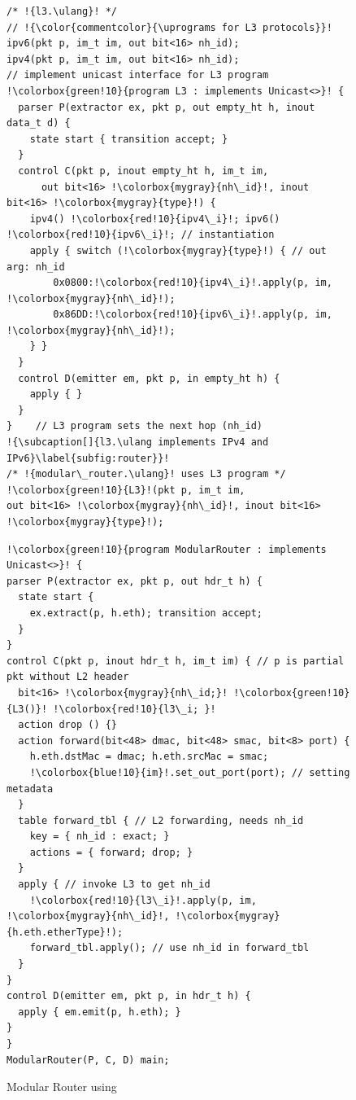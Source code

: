 \documentclass[letterpaper,twocolumn,10pt]{article}
\begin{document}
\begin{figure}[!ht]
\noindent \begin{minipage}[t]{.50\textwidth}
\begin{lstlisting}[frame=none, escapechar=!]
/* !{l3.\ulang}! */
// !{\color{commentcolor}{\uprograms for L3 protocols}}! 
ipv6(pkt p, im_t im, out bit<16> nh_id);
ipv4(pkt p, im_t im, out bit<16> nh_id);
// implement unicast interface for L3 program
!\colorbox{green!10}{program L3 : implements Unicast<>}! {
  parser P(extractor ex, pkt p, out empty_ht h, inout data_t d) {
    state start { transition accept; }
  }
  control C(pkt p, inout empty_ht h, im_t im,
      out bit<16> !\colorbox{mygray}{nh\_id}!, inout bit<16> !\colorbox{mygray}{type}!) {
    ipv4() !\colorbox{red!10}{ipv4\_i}!; ipv6() !\colorbox{red!10}{ipv6\_i}!; // instantiation
    apply { switch (!\colorbox{mygray}{type}!) { // out arg: nh_id
        0x0800:!\colorbox{red!10}{ipv4\_i}!.apply(p, im, !\colorbox{mygray}{nh\_id}!);
        0x86DD:!\colorbox{red!10}{ipv6\_i}!.apply(p, im, !\colorbox{mygray}{nh\_id}!);
    } }
  }
  control D(emitter em, pkt p, in empty_ht h) {
    apply { }
  }
}    // L3 program sets the next hop (nh_id)
!{\subcaption[]{l3.\ulang implements IPv4 and IPv6}\label{subfig:router}}!
/* !{modular\_router.\ulang}! uses L3 program */
!\colorbox{green!10}{L3}!(pkt p, im_t im, 
out bit<16> !\colorbox{mygray}{nh\_id}!, inout bit<16> !\colorbox{mygray}{type}!);
\end{lstlisting}
\end{minipage}\hspace{-4pt}\vline
\hfill\begin{minipage}[t]{.50\textwidth}
\begin{lstlisting}[frame=none, escapechar=!]
!\colorbox{green!10}{program ModularRouter : implements Unicast<>}! {
parser P(extractor ex, pkt p, out hdr_t h) {
  state start {
    ex.extract(p, h.eth); transition accept;
  }
}
control C(pkt p, inout hdr_t h, im_t im) { // p is partial pkt without L2 header
  bit<16> !\colorbox{mygray}{nh\_id;}! !\colorbox{green!10}{L3()}! !\colorbox{red!10}{l3\_i; }!
  action drop () {}
  action forward(bit<48> dmac, bit<48> smac, bit<8> port) {
    h.eth.dstMac = dmac; h.eth.srcMac = smac;
    !\colorbox{blue!10}{im}!.set_out_port(port); // setting metadata
  }
  table forward_tbl { // L2 forwarding, needs nh_id
    key = { nh_id : exact; } 
    actions = { forward; drop; }
  }
  apply { // invoke L3 to get nh_id
    !\colorbox{red!10}{l3\_i}!.apply(p, im, !\colorbox{mygray}{nh\_id}!, !\colorbox{mygray}{h.eth.etherType}!);
    forward_tbl.apply(); // use nh_id in forward_tbl
  }
}
control D(emitter em, pkt p, in hdr_t h) {
  apply { em.emit(p, h.eth); }
}
}
ModularRouter(P, C, D) main;
\end{lstlisting}
\label{subfig:router-main}
\end{minipage}
\caption[]{Modular Router using \uarch \footnotemark}
\label{fig:modular-router}
\end{figure}
\end{document}
